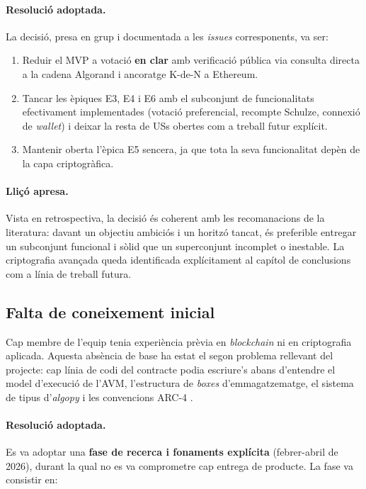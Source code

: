 \paragraph{Resolució adoptada.} La decisió, presa en grup i
documentada a les \emph{issues} corresponents, va ser:

\begin{enumerate}
    \item Reduir el \ac{MVP} a votació \textbf{en clar} amb
    verificació pública via consulta directa a la cadena Algorand i
    ancoratge K-de-N a Ethereum.
    \item Tancar les èpiques E3, E4 i E6 amb el subconjunt de
    funcionalitats efectivament implementades (votació preferencial,
    recompte Schulze, connexió de \emph{wallet}) i deixar la resta de
    \acsp{US} obertes com a treball futur explícit.
    \item Mantenir oberta l'èpica E5 sencera, ja que tota la seva
    funcionalitat depèn de la capa criptogràfica.
\end{enumerate}

\paragraph{Lliçó apresa.} Vista en retrospectiva, la decisió és
coherent amb les recomanacions de la literatura: davant un objectiu
ambiciós i un horitzó tancat, és preferible entregar un subconjunt
funcional i sòlid que un superconjunt incomplet o inestable. La
criptografia avançada queda identificada explícitament al capítol de
conclusions com a línia de treball futura.

\subsection{Falta de coneixement inicial}
\label{sec:falta-coneixement}

Cap membre de l'equip tenia experiència prèvia en \emph{blockchain}
ni en criptografia aplicada. Aquesta absència de base ha estat el
segon problema rellevant del projecte: cap línia de codi del
contracte podia escriure's abans d'entendre el model d'execució de
l'\ac{AVM}, l'estructura de \emph{boxes} d'emmagatzematge, el sistema
de tipus d'\emph{algopy} i les convencions ARC-4
\cite{algorandfoundation2023arc4}.

\paragraph{Resolució adoptada.} Es va adoptar una \textbf{fase de
recerca i fonaments explícita} (febrer-abril de 2026), durant la qual
no es va comprometre cap entrega de producte. La fase va consistir en:

